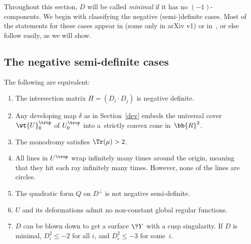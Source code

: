 Throughout this section, $D$ will be called {\it minimal} if it has no $(-1)$-components. We begin with classifying the negative (semi-)definite cases. Most of the statements for these cases appear in \cite{GHK1} (some only in arXiv v1) or in~\cite{GHK2}, or else follow easily, as we will show.

\subsection{The negative semi-definite cases}

\begin{thm}\label{NegD}
The following are equivalent:
\begin{enumerate}\itemsep=0pt
\item[$1.$] The {intersection matrix} $H=(D_i \cdot D_j)$ is negative definite.
\item[$2.$] Any {developing map} $\delta$ as in Section~{\rm \ref{dev}} embeds the universal cover $\wt{U}_0^{\trop}$ of $U^{\trop}_0$ into a~strictly convex cone in~$\bb{R}^2$.
\item[$3.$] The {monodromy} satisfies $\Tr(\mu) > 2$.
\item[$4.$] All {lines} in $U^{\trop}$ wrap infinitely many times around the origin, meaning that they hit each ray infinitely many times. However, none of the lines are circles.
\item[$5.$] The {quadratic form} $Q$ on $D^{\perp}$ is not negative semi-definite.
\item[$6.$] $U$ and its deformations admit no non-constant global regular {functions}.
\item[$7.$] $D$ can be blown down to get a surface $\?{Y}$ with a cusp singularity. If $D$ is minimal, $D_i^2 \leq -2$ for all $i$, and $D_i^2 \leq -3$ for some~$i$.
\end{enumerate}
\end{thm}

